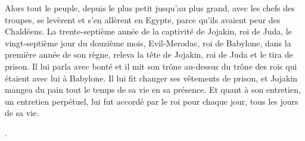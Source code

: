 \begin{multicols}{2}
Alors tout le peuple, depuis le plus petit jusqu'au plus grand, avec les chefs des troupes, se levèrent et s'en allèrent en Egypte, parce qu'ils avaient peur des Chaldéens.
La trente-septième année de la captivité de Jojakin, roi de Juda, le vingt-septième jour du douzième mois, Evil-Merodac, roi de Babylone, dans la première année de son règne, releva la tête de Jojakin, roi de Juda et le tira de prison.
Il lui parla avec bonté et il mit son trône au-dessus du trône des rois qui étaient avec lui à Babylone.
Il lui fit changer ses vêtements de prison, et Jojakin mangea du pain tout le temps de sa vie en sa présence.
Et quant à son entretien, un entretien perpétuel, lui fut accordé par le roi pour chaque jour, tous les jours de sa vie.
\PPE{}
\end{multicols}.
